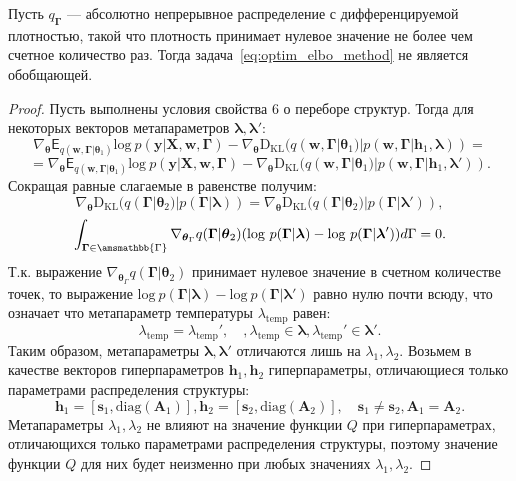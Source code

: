 \begin{theorem}
Пусть $q_{\boldsymbol{\Gamma}}$ --- абсолютно непрерывное распределение с дифференцируемой плотностью, такой что плотность принимает нулевое значение не более чем счетное количество раз. Тогда задача~\eqref{eq:optim_elbo_method} не является обобщающей.
\end{theorem}
\begin{proof}
Пусть выполнены условия свойства 6 о переборе структур. 
Тогда для некоторых векторов метапараметров $\boldsymbol{\lambda},\boldsymbol{\lambda}'$:
\[
    \nabla_{\boldsymbol{\theta}} \mathsf{E}_{q(\mathbf{w}, \boldsymbol{\Gamma}|\boldsymbol{\theta}_1)} \text{log}~p(\mathbf{y}|\mathbf{X}, \mathbf{w}, \boldsymbol{\Gamma}) -\nabla_{\boldsymbol{\theta}}  \text{D}_{\text{KL}}(q(\mathbf{w}, \boldsymbol{\Gamma}|\boldsymbol{\theta}_1) | p(\mathbf{w}, \boldsymbol{\Gamma}|\mathbf{h}_1, \boldsymbol{\lambda})) = 
\]
\[
= \nabla_{\boldsymbol{\theta}} \mathsf{E}_{q(\mathbf{w}, \boldsymbol{\Gamma}|\boldsymbol{\theta}_1)} \text{log}~p(\mathbf{y}|\mathbf{X}, \mathbf{w}, \boldsymbol{\Gamma}) - \nabla_{\boldsymbol{\theta}}  \text{D}_{\text{KL}}(q(\mathbf{w}, \boldsymbol{\Gamma}|\boldsymbol{\theta}_1) | p(\mathbf{w}, \boldsymbol{\Gamma}|\mathbf{h}_1, \boldsymbol{\lambda}')).
\]
Сокращая равные слагаемые в равенстве получим:
\[
\nabla_{\boldsymbol{\theta}}  \text{D}_{\text{KL}}(q(\boldsymbol{\Gamma}|\boldsymbol{\theta}_2) | p(\boldsymbol{\Gamma}| \boldsymbol{\lambda})) = \nabla_{\boldsymbol{\theta}} \text{D}_{\text{KL}}(q(\boldsymbol{\Gamma}|\boldsymbol{\theta}_2) | p(\boldsymbol{\Gamma}| \boldsymbol{\lambda}')),
\] 
\[
\int_{\boldsymbol{\Gamma} \in \amsmathbb{\Gamma}} \nabla_{\boldsymbol{\theta}_\Gamma} q(\boldsymbol{\Gamma}|\boldsymbol{\theta}_2) (\text{log}~p(\boldsymbol{\Gamma}| \boldsymbol{\lambda}) - \text{log}~p(\boldsymbol{\Gamma}| \boldsymbol{\lambda}')) d\Gamma = 0.
\]
Т.к. выражение $ \nabla_{\boldsymbol{\theta}_\Gamma} q(\boldsymbol{\Gamma}|\boldsymbol{\theta}_2)$ принимает нулевое значение в счетном количестве точек, то выражение $\text{log}~p(\boldsymbol{\Gamma}| \boldsymbol{\lambda}) - \text{log}~p(\boldsymbol{\Gamma}| \boldsymbol{\lambda}')$ равно нулю почти всюду, что означает что метапараметр температуры $\lambda_\text{temp}$  равен:
\[
\lambda_\text{temp} = \lambda_\text{temp}',\quad, \lambda_\text{temp} \in \boldsymbol{\lambda}, \lambda_\text{temp}' \in \boldsymbol{\lambda}'.
\]
Таким образом, метапараметры $\boldsymbol{\lambda},\boldsymbol{\lambda}'$ отличаются лишь на $\lambda_1, \lambda_2$. 
Возьмем в качестве векторов гиперпараметров $\mathbf{h}_1,\mathbf{h}_2$ гиперпараметры, отличающиеся только параметрами распределения структуры:
\[
    \mathbf{h}_1 = [\mathbf{s}_1, \text{diag}(\mathbf{A}_1)], \mathbf{h}_2 = [\mathbf{s}_2, \text{diag}(\mathbf{A}_2)],\quad \mathbf{s}_1 \neq \mathbf{s}_2, \mathbf{A}_1 = \mathbf{A}_2.
\]
Метапараметры $\lambda_1, \lambda_2$ не влияют на значение функции $Q$ при гиперпараметрах, отличающихся только параметрами распределения структуры, поэтому значение функции $Q$ для них будет неизменно при любых значениях $\lambda_1, \lambda_2$.

\end{proof}

